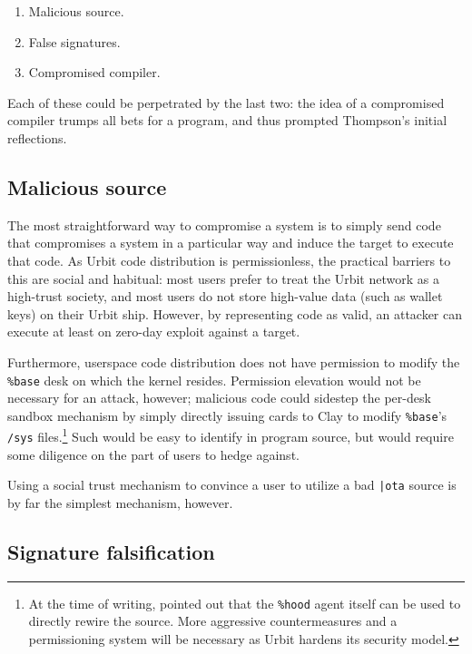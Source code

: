 \documentclass[twoside]{article}
\begin{document}
\begin{enumerate}
  \item  Malicious source.
  \item  False signatures.
  \item  Compromised compiler.
\end{enumerate}

\noindent
Each of these could be perpetrated by the last two:  the idea of a compromised compiler trumps all bets for a program, and thus prompted Thompson's initial reflections.

\subsection{Malicious source}

The most straightforward way to compromise a system is to simply send code that compromises a system in a particular way and induce the target to execute that code.  As Urbit code distribution is permissionless, the practical barriers to this are social and habitual:  most users prefer to treat the Urbit network as a high-trust society, and most users do not store high-value data (such as wallet keys) on their Urbit ship.  However, by representing code as valid, an attacker can execute at least on zero-day exploit against a target.

Furthermore, userspace code distribution does not have permission to modify the \lstinline[style=inlinecode]{%base} desk on which the kernel resides.  Permission elevation would not be necessary for an attack, however; malicious code could sidestep the per-desk sandbox mechanism by simply directly issuing cards to Clay to modify \lstinline[style=inlinecode]{%base}'s \lstinline[style=inlinecode]{/sys} files.\footnote{At the time of writing,  pointed out that the \texttt{\%hood} agent itself can be used to directly rewire the source.  More aggressive countermeasures and a permissioning system will be necessary as Urbit hardens its security model.}  Such would be easy to identify in program source, but would require some diligence on the part of users to hedge against.

Using a social trust mechanism to convince a user to utilize a bad \lstinline[style=inlinecode]{|ota} source is by far the simplest mechanism, however.

\subsection{Signature falsification}
\end{document}
